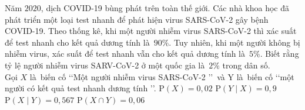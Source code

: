 \begin{ex}%
	Năm $2020$, dịch COVID-19 bùng phát trên toàn thế giới. Các nhà khoa  học đã phát triển một loại test nhanh để phát hiện virus SARS-CoV-2 gây bệnh COVID-19. Theo thống kê, khi một người nhiễm virus SARS-CoV-2 thì xác suất để test nhanh cho kết quả dương tính là~$90 \%$. Tuy nhiên, khi một người không bị nhiễm virus, xác suất để test nhanh vẫn cho kết quả dương tính là~$5 \%$. Biết rằng tỷ lệ người nhiễm virus SARV-CoV-2 ở một quốc gia là~$2 \%$ trong dân số.\\
	Gọi $X$ là~biến cố \lq \lq Một người nhiễm virus SARS-CoV-2 \rq \rq \ và  Y là~biến cố \lq \lq một người có kết quả test nhanh dương tính \rq \rq.
	\choiceTF 
		 {\True $\mathrm{P}(X)=0{,}02$}
		{\True $\mathrm{P}(Y\mid X)=0{,}9$} 
		 {\True $\mathrm{P}(X\mid Y)=0{,}567$}
		{$\mathrm{P}(X  \cap Y)=0{,}06$}
\end{ex}

